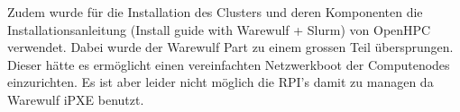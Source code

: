 Zudem wurde für die Installation des Clusters und deren Komponenten die Installationsanleitung (Install guide with Warewulf + Slurm) von OpenHPC verwendet. Dabei wurde der Warewulf Part zu einem grossen Teil übersprungen. Dieser hätte es ermöglicht einen vereinfachten Netzwerkboot der Computenodes einzurichten. Es ist aber leider nicht möglich die RPI's damit zu managen da Warewulf iPXE benutzt.







